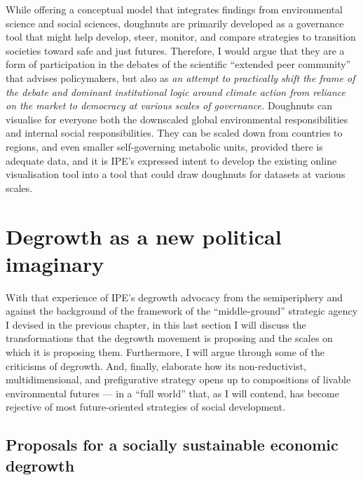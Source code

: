 \documentclass[a4paper, nobind]{templates/ociamthesis}
\begin{document}
While offering a conceptual model that integrates findings from environmental science and social sciences, doughnuts are primarily developed as a governance tool that might help develop, steer, monitor, and compare strategies to transition societies toward safe and just futures. Therefore, I would argue that they are a form of participation in the debates of the scientific ``extended peer community'' that advises policymakers, but also as \emph{an attempt to practically shift the frame of the debate and dominant institutional logic around climate action from reliance on the market to democracy at various scales of governance.} Doughnuts can visualise for everyone both the downscaled global environmental responsibilities and internal social responsibilities. They can be scaled down from countries to regions, and even smaller self-governing metabolic units, provided there is adequate data, and it is IPE's expressed intent to develop the existing online visualisation tool into a tool that could draw doughnuts for datasets at various scales.

\hypertarget{degrowth-as-a-new-political-imaginary}{%
\section{Degrowth as a new political imaginary}\label{degrowth-as-a-new-political-imaginary}}

With that experience of IPE's degrowth advocacy from the semiperiphery and against the background of the framework of the ``middle-ground'' strategic agency I devised in the previous chapter, in this last section I will discuss the transformations that the degrowth movement is proposing and the scales on which it is proposing them. Furthermore, I will argue through some of the criticisms of degrowth. And, finally, elaborate how its non-reductivist, multidimensional, and prefigurative strategy opens up to compositions of livable environmental futures --- in a ``full world'' that, as I will contend, has become rejective of most future-oriented strategies of social development.

\hypertarget{proposals-for-a-socially-sustainable-economic-degrowth}{%
\subsection{Proposals for a socially sustainable economic degrowth}\label{proposals-for-a-socially-sustainable-economic-degrowth}}
\end{document}
